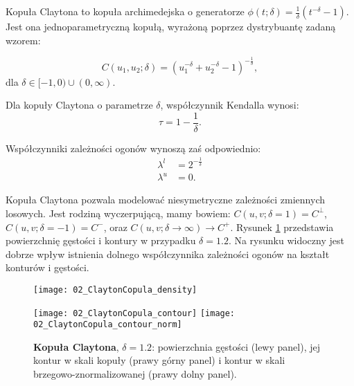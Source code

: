 \begin{df}
	Kopuła Claytona to kopuła archimedejska o generatorze $\phi(t;\delta) = \frac{1}{\delta}(t^{-\delta}-1)$. Jest ona jednoparametryczną kopułą, wyrażoną poprzez dystrybuantę zadaną wzorem:
	
	$$ C(u_1, u_2; \delta) = (u_1 ^{-\delta} + u_2^{-\delta} - 1)^{-\frac{1}{\delta}},$$
	dla $\delta \in [-1, 0) \cup (0, \infty).$
\end{df}
\begin{prop}
	Dla kopuły Claytona o parametrze $\delta$, współczynnik Kendalla wynosi:
	$$ \tau = 1 - \frac{1}{\delta}.$$
	
	Współczynniki zależności ogonów wynoszą zaś odpowiednio:
	\begin{equation}
		\begin{split}
			\lambda^{l}&=2^{-\frac{1}{\delta}} \\
			\lambda^{u}&=0.
		\end{split}
	\end{equation}
\end{prop}
Kopuła Claytona pozwala modelować niesymetryczne zależności zmiennych losowych. Jest rodziną wyczerpującą, mamy bowiem: $C(u,v;\delta = 1) = C^{\perp}$, $C(u,v;\delta = -1) = C^{-}$, oraz $C(u,v;\delta \to \infty) \to C^{+}$. Rysunek \ref{fig:clayton_copula_density} przedstawia powierzchnię gęstości i kontury w przypadku $\delta = 1.2$. Na rysunku widoczny jest dobrze wpływ istnienia dolnego współczynnika zależności ogonów na kształt konturów i gęstości.

\begin{figure}[h]
	\centering
	\begin{minipage}{0.5\linewidth}
		\texttt{[image: 02\_ClaytonCopula\_density]}
	\end{minipage}
	\begin{minipage}{0.45\linewidth}
		\texttt{[image: 02\_ClaytonCopula\_contour]}
		\texttt{[image: 02\_ClaytonCopula\_contour\_norm]}
	\end{minipage}
	\caption{\textbf{Kopuła Claytona}, $\delta = 1.2$: powierzchnia gęstości (lewy panel), jej kontur w skali kopuły (prawy górny panel) i kontur w skali brzegowo-znormalizowanej (prawy dolny panel). \label{fig:clayton_copula_density}}
\end{figure}

